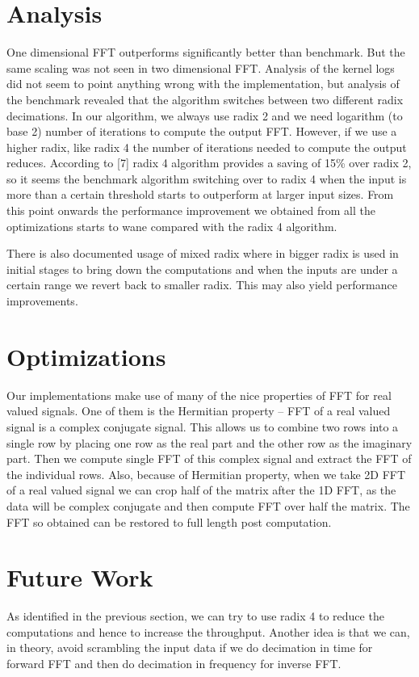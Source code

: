 \documentclass[sigconf]{acmart}
\begin{document}
\section{Analysis}
One dimensional FFT outperforms significantly better than benchmark. But the same scaling was not seen in two dimensional FFT. Analysis of the kernel logs did not seem to point anything wrong with the implementation, but analysis of the benchmark revealed that the algorithm switches between two different radix decimations. In our algorithm, we always use radix 2 and we need logarithm (to base 2) number of iterations to compute the output FFT. However, if we use a higher radix, like radix 4 the number of iterations needed to compute the output reduces. According to [7] radix 4 algorithm provides a saving of 15\% over radix 2, so it seems the benchmark algorithm switching over to radix 4 when the input is more than a certain threshold starts to outperform at larger input sizes. From this point onwards the performance improvement we obtained from all the optimizations starts to wane compared with the radix 4 algorithm. 

There is also documented usage of mixed radix where in bigger radix is used in initial stages to bring down the computations and when the inputs are under a certain range we revert back to smaller radix. This may also yield performance improvements.


\section{Optimizations}
Our implementations make use of many of the nice properties of FFT for real valued signals. One of them is the Hermitian property – FFT of a real valued signal is a complex conjugate signal. This allows us to combine two rows into a single row by placing one row as the real part and the other row as the imaginary part. Then we compute single FFT of this complex signal and extract the FFT of the individual rows. Also, because of Hermitian property, when we take 2D FFT of a real valued signal we can crop half of the matrix after the 1D FFT, as the data will be complex conjugate and then compute FFT over half the matrix. The FFT so obtained can be restored to full length post computation.

\section{Future Work}
As identified in the previous section, we can try to use radix 4 to reduce the computations and hence to increase the throughput. Another idea is that we can, in theory, avoid scrambling the input data if we do decimation in time for forward FFT and then do decimation in frequency for inverse FFT.
\end{document}
